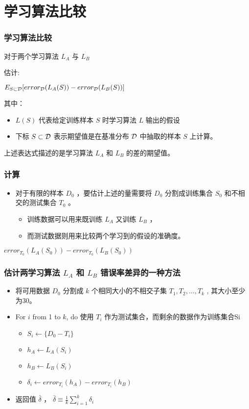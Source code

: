 \documentclass{beamer}
\begin{document}
\section{学习算法比较}
\label{sec-6}
\begin{frame}
\frametitle{学习算法比较}
\label{sec-6-1}


对于两个学习算法 $L_{A}$ 与 $L_{B}$

估计:

$E_{S \subset \cal{D}}[ error_{\cal{D}}(L_{A}(S)) - error_{\cal{D}}(L_{B}(S))]$

其中：

\begin{itemize}
\item $L(S)$ 代表给定训练样本 $S$ 时学习算法 $L$ 输出的假设
\item 下标 $S \subset \cal{D}$ 表示期望值是在基准分布 $\cal{D}$ 中抽取的样本 $S$ 上计算。
\end{itemize}

上述表达式描述的是学习算法 $L_A$ 和 $L_B$ 的差的期望值。
\end{frame}
\begin{frame}
\frametitle{计算}
\label{sec-6-2}


\begin{itemize}
\item 对于有限的样本 $D_0$ ，要估计上述的量需要将 $D_0$ 分割成训练集合 $S_0$ 和不相交的测试集合 $T_0$ 。
\begin{itemize}
\item 训练数据可以用来既训练 $L_A$ 又训练 $L_B$ ，
\item 而测试数据则用来比较两个学习到的假设的准确度。
\end{itemize}
\end{itemize}

$error_{T_{0}}(L_{A}(S_{0})) - error_{T_{0}}(L_{B}(S_{0}))$
\end{frame}
\begin{frame}
\frametitle{估计两学习算法 $L_A$ 和 $L_B$ 错误率差异的一种方法}
\label{sec-6-3}


\begin{itemize}
\item 将可用数据 $D_{0}$ 分割成 $k$ 个相同大小的不相交子集 $T_{1}, T_{2},\ldots, T_{k}$ , 其大小至少为30。
\item For $i$ from 1 to $k$, do
    使用 $T_{i}$ 作为测试集合，而剩余的数据作为训练集合Si
\begin{itemize}
\item $S_{i} \leftarrow \{D_{0} - T_{i}\}$
\item $h_{A} \leftarrow L_{A}(S_{i})$
\item $h_{B} \leftarrow L_{B}(S_{i})$
\item $\delta_{i} \leftarrow error_{T_{i}}(h_{A}) - error_{T_{i}}(h_{B})$
\end{itemize}
\item 返回值 $\bar{\delta}$ ， $\bar{\delta} \equiv \frac{1}{k}\sum_{i=1}^{k} \delta_{i}$
\end{itemize}
\end{frame}
\end{document}
